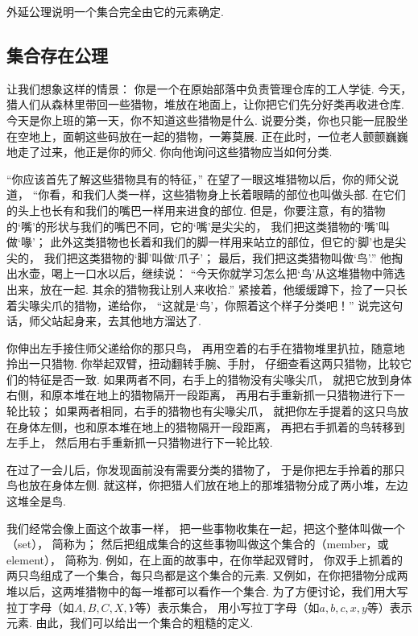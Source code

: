 外延公理说明一个集合完全由它的元素确定.


\subsection{集合存在公理}
让我们想象这样的情景：
你是一个在原始部落中负责管理仓库的工人学徒.
今天，猎人们从森林里带回一些猎物，堆放在地面上，让你把它们先分好类再收进仓库.
今天是你上班的第一天，你不知道这些猎物是什么.
说要分类，你也只能一屁股坐在空地上，面朝这些码放在一起的猎物，一筹莫展.
正在此时，一位老人颤颤巍巍地走了过来，他正是你的师父.
你向他询问这些猎物应当如何分类.

“你应该首先了解这些猎物具有的特征，”
在望了一眼这堆猎物以后，你的师父说道，
“你看，和我们人类一样，这些猎物身上长着眼睛的部位也叫做头部.
在它们的头上也长有和我们的嘴巴一样用来进食的部位.
但是，你要注意，有的猎物的‘嘴’的形状与我们的嘴巴不同，它的‘嘴’是尖尖的，
我们把这类猎物的‘嘴’叫做‘喙’；
此外这类猎物也长着和我们的脚一样用来站立的部位，但它的‘脚’也是尖尖的，
我们把这类猎物的‘脚’叫做‘爪子’；
最后，我们把这类猎物叫做‘鸟’.”
他掏出水壶，喝上一口水以后，继续说：
“今天你就学习怎么把‘鸟’从这堆猎物中筛选出来，放在一起.
其余的猎物我让别人来收拾.”
紧接着，他缓缓蹲下，捡了一只长着尖喙尖爪的猎物，递给你，
“这就是‘鸟’，你照着这个样子分类吧！”
说完这句话，师父站起身来，去其他地方溜达了.

你伸出左手接住师父递给你的那只鸟，
再用空着的右手在猎物堆里扒拉，随意地拎出一只猎物.
你举起双臂，扭动翻转手腕、手肘，
仔细查看这两只猎物，比较它们的特征是否一致.
如果两者不同，右手上的猎物没有尖喙尖爪，
就把它放到身体右侧，和原本堆在地上的猎物隔开一段距离，
再用右手重新抓一只猎物进行下一轮比较；
如果两者相同，右手的猎物也有尖喙尖爪，
就把你左手提着的这只鸟放在身体左侧，也和原本堆在地上的猎物隔开一段距离，
再把右手抓着的鸟转移到左手上，
然后用右手重新抓一只猎物进行下一轮比较.

在过了一会儿后，你发现面前没有需要分类的猎物了，
于是你把左手拎着的那只鸟也放在身体左侧.
就这样，你把猎人们放在地上的那堆猎物分成了两小堆，左边这堆全是鸟.


我们经常会像上面这个故事一样，
把一些事物收集在一起，把这个整体叫做一个（set），
简称为；
然后把组成集合的这些事物叫做这个集合的（member，或element），
简称为.
例如，在上面的故事中，在你举起双臂时，
你双手上抓着的两只鸟组成了一个集合，每只鸟都是这个集合的元素.
又例如，在你把猎物分成两堆以后，这两堆猎物中的每一堆都可以看作一个集合.
为了方便讨论，我们用大写拉丁字母（如\(A,B,C,X,Y\)等）表示集合，
用小写拉丁字母（如\(a,b,c,x,y\)等）表示元素.
由此，我们可以给出一个集合的粗糙的定义.

